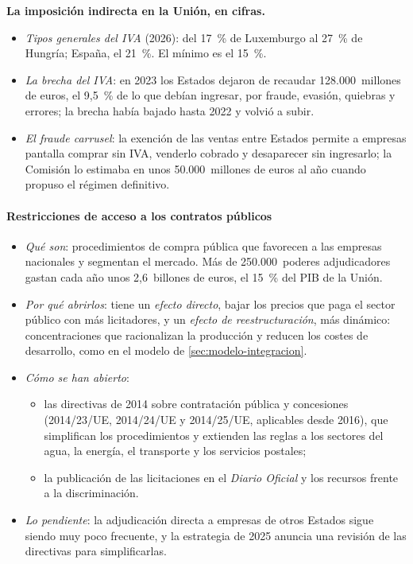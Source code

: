 \documentclass[11pt]{article}
\begin{document}
\begin{anotaciones}
\textbf{La imposición indirecta en la Unión, en cifras.}
\begin{itemize}
\item \emph{Tipos generales del IVA} (2026): del 17~\% de Luxemburgo al 27~\% de Hungría; España, el 21~\%. El mínimo es el 15~\%\nocite{CE2026TiposIVA}.
\item \emph{La brecha del IVA}: en 2023 los Estados dejaron de recaudar 128.000~millones de euros, el 9,5~\% de lo que debían ingresar, por fraude, evasión, quiebras y errores; la brecha había bajado hasta 2022 y volvió a subir\nocite{CE2025BrechaIVA}.
\item \emph{El fraude carrusel}: la exención de las ventas entre Estados permite a empresas pantalla comprar sin IVA, venderlo cobrado y desaparecer sin ingresarlo; la Comisión lo estimaba en unos 50.000~millones de euros al año cuando propuso el régimen definitivo\nocite{CE2017RegimenDefinitivo}.
\end{itemize}
\end{anotaciones}

\paragraph{Restricciones de acceso a los contratos públicos}

\begin{itemize}
\item \emph{Qué son}: procedimientos de compra pública que favorecen a las empresas nacionales y segmentan el mercado. Más de 250.000~poderes adjudicadores gastan cada año unos 2,6~billones de euros, el 15~\% del PIB de la Unión\nocite{CE2026Contratacion}.
\item \emph{Por qué abrirlos}: tiene un \emph{efecto directo}, bajar los precios que paga el sector público con más licitadores, y un \emph{efecto de reestructuración}, más dinámico: concentraciones que racionalizan la producción y reducen los costes de desarrollo, como en el modelo de \ref{sec:modelo-integracion}.
\item \emph{Cómo se han abierto}:
  \begin{itemize}
  \item las directivas de 2014 sobre contratación pública y concesiones (2014/23/UE, 2014/24/UE y 2014/25/UE, aplicables desde 2016)\nocite{CE2026Contratacion}, que simplifican los procedimientos y extienden las reglas a los sectores del agua, la energía, el transporte y los servicios postales;
  \item la publicación de las licitaciones en el \emph{Diario Oficial} y los recursos frente a la discriminación.
  \end{itemize}
\item \emph{Lo pendiente}: la adjudicación directa a empresas de otros Estados sigue siendo muy poco frecuente, y la estrategia de 2025 anuncia una revisión de las directivas para simplificarlas.
\end{itemize}
\end{document}
